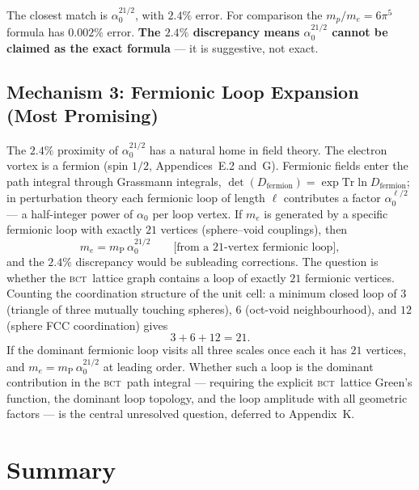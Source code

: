 \documentclass[aps,prl,preprint,superscriptaddress,floatfix]{revtex4-2}
\newcommand{\az}{\alpha_0}
\newcommand{\mP}{m_{\mathrm{P}}}
\newcommand{\BCT}{\textsc{bct}}
\begin{document}
The closest match is $\az^{21/2}$, with $2.4\%$ error. For comparison the
$m_p/m_e = 6\pi^5$ formula has $0.002\%$ error. \textbf{The $2.4\%$ discrepancy
means $\az^{21/2}$ cannot be claimed as the exact formula} --- it is suggestive,
not exact.

\subsection{Mechanism 3: Fermionic Loop Expansion (Most Promising)}

The $2.4\%$ proximity of $\az^{21/2}$ has a natural home in field theory. The
electron vortex is a fermion (spin $1/2$, Appendices~E.2 and~G). Fermionic
fields enter the path integral through Grassmann integrals,
$\det(D_{\mathrm{fermion}}) = \exp\mathrm{Tr}\ln D_{\mathrm{fermion}}$; in
perturbation theory each fermionic loop of length $\ell$ contributes a factor
$\az^{\ell/2}$ --- a half-integer power of $\az$ per loop vertex. If $m_e$ is
generated by a specific fermionic loop with exactly $21$ vertices
(sphere--void couplings), then
\begin{equation}
  m_e = \mP\,\az^{21/2}\qquad\text{[from a 21-vertex fermionic loop]},
\end{equation}
and the $2.4\%$ discrepancy would be subleading corrections. The question is
whether the \BCT\ lattice graph contains a loop of exactly $21$ fermionic
vertices. Counting the coordination structure of the unit cell: a minimum closed
loop of $3$ (triangle of three mutually touching spheres), $6$ (oct-void
neighbourhood), and $12$ (sphere FCC coordination) gives
\begin{equation}
  3+6+12 = 21 .
\end{equation}
If the dominant fermionic loop visits all three scales once each it has $21$
vertices, and $m_e = \mP\,\az^{21/2}$ at leading order. Whether such a loop is
the dominant contribution in the \BCT\ path integral --- requiring the explicit
\BCT\ lattice Green's function, the dominant loop topology, and the loop
amplitude with all geometric factors --- is the central unresolved question,
deferred to Appendix~K.

\section{Summary}
\label{sec:summary}
\end{document}
